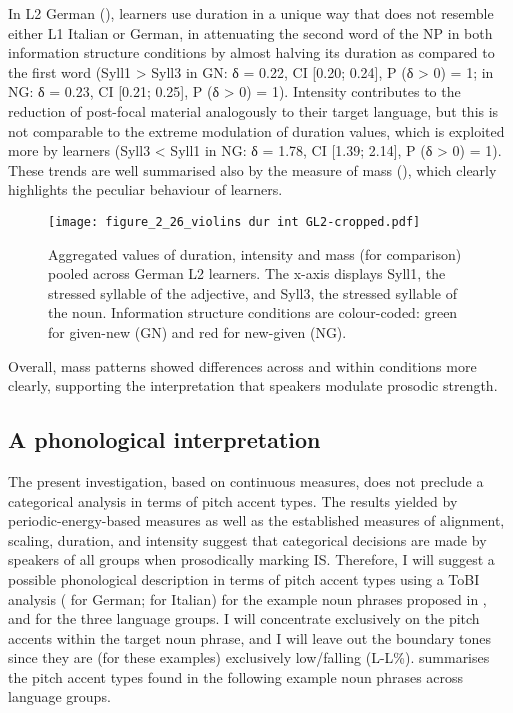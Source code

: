 In L2 German (), learners use duration in a unique way that does not resemble either L1 Italian or German, in attenuating the second word of the NP in both information structure conditions by almost halving its duration as compared to the first word (Syll1 > Syll3 in GN: δ = 0.22, CI [0.20; 0.24], P (δ > 0) = 1; in NG: δ = 0.23, CI [0.21; 0.25], P (δ > 0) = 1). Intensity contributes to the reduction of post-focal material analogously to their target language, but this is not comparable to the extreme modulation of duration values, which is exploited more by learners (Syll3 < Syll1 in NG: δ = 1.78, CI [1.39; 2.14], P (δ > 0) = 1). These trends are well summarised also by the measure of mass (), which clearly highlights the peculiar behaviour of learners.

\begin{figure}
\texttt{[image: figure\_2\_26\_violins dur int GL2-cropped.pdf]}
\caption{Aggregated values of duration, intensity and mass (for comparison) pooled across German L2 learners. The x-axis displays Syll1, the stressed syllable of the adjective, and Syll3, the stressed syllable of the noun. Information structure conditions are colour-coded: green for given-new (GN) and red for new-given (NG).}
\label{fig:2.26}
\end{figure}

Overall, mass patterns showed differences across and within conditions more clearly, supporting the interpretation that speakers modulate prosodic strength.

\subsection{A phonological interpretation}
\label{sec:2.8.4}
The present investigation, based on continuous measures, does not preclude a categorical analysis in terms of pitch accent types. The results yielded by periodic-energy-based measures as well as the established measures of alignment, scaling, duration, and intensity suggest that categorical decisions are made by speakers of all groups when prosodically marking IS. Therefore, I will suggest a possible phonological description in terms of pitch accent types using a ToBI analysis (\citealt{GriceEtAl2005} for German; \citealt{GriceEtAl2005} for Italian) for the example noun phrases proposed in ,  and  for the three language groups. I will concentrate exclusively on the pitch accents within the target noun phrase, and I will leave out the boundary tones since they are (for these examples) exclusively low/falling (L-L\%).  summarises the pitch accent types found in the following example noun phrases across language groups.

